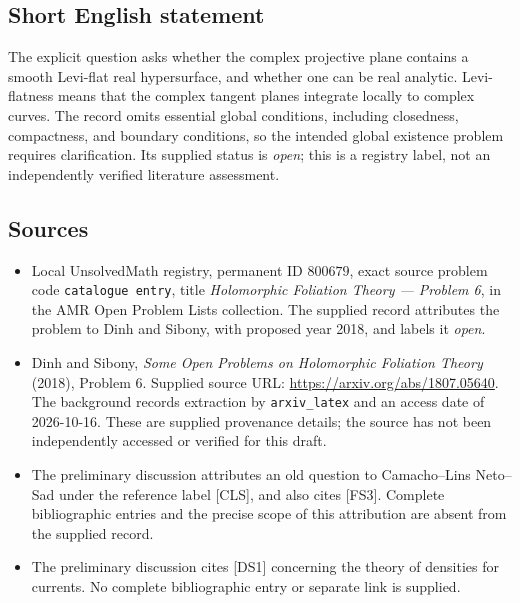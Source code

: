 \documentclass[11pt]{article}
\begin{document}
\subsection{Short English statement}
The explicit question asks whether the complex projective plane contains a smooth Levi-flat real hypersurface, and whether one can be real analytic. Levi-flatness means that the complex tangent planes integrate locally to complex curves. The record omits essential global conditions, including closedness, compactness, and boundary conditions, so the intended global existence problem requires clarification. Its supplied status is \emph{open}; this is a registry label, not an independently verified literature assessment.
\subsection{Sources}
\begin{itemize}
\item Local UnsolvedMath registry, permanent ID \(800679\), exact source problem code \texttt{catalogue entry}, title \emph{Holomorphic Foliation Theory --- Problem 6}, in the AMR Open Problem Lists collection. The supplied record attributes the problem to Dinh and Sibony, with proposed year 2018, and labels it \emph{open}.
\item Dinh and Sibony, \emph{Some Open Problems on Holomorphic Foliation Theory} (2018), Problem 6. Supplied source URL: \url{https://arxiv.org/abs/1807.05640}. The background records extraction by \texttt{arxiv\_latex} and an access date of 2026-10-16. These are supplied provenance details; the source has not been independently accessed or verified for this draft.
\item The preliminary discussion attributes an old question to Camacho--Lins Neto--Sad under the reference label [CLS], and also cites [FS3]. Complete bibliographic entries and the precise scope of this attribution are absent from the supplied record.
\item The preliminary discussion cites [DS1] concerning the theory of densities for currents. No complete bibliographic entry or separate link is supplied.
\end{itemize}
\end{document}
